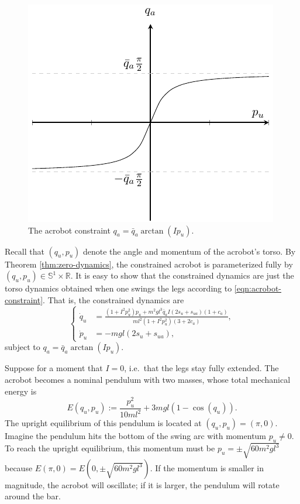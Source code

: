 \documentclass[journal,twoside,web]{ieeecolor}
\newcommand*{\R}{\mathbb{R}}
\newcommand*{\Sone}{\mathbb{S}^1}
\newcommand*{\SxR}{\Sone \times \R}
\begin{document}
\begin{figure}
    \centering
    \includegraphics[width=0.7\linewidth]{qa_arctan.pdf}
    \caption{The acrobot constraint \(q_a = \bar{q}_a \arctan(I p_u)\).}
    \label{fig:qa-arctan}
\end{figure}

Recall that \((q_u, p_u)\) denote the angle and momentum of the acrobot's torso.
By Theorem \ref{thm:zero-dynamics}, the constrained acrobot is parameterized
fully by \((q_u,p_u) \in \SxR\).
It is easy to show that the constrained dynamics are just the torso dynamics
obtained when one swings the legs according to \eqref{eqn:acrobot-constraint}.
That is, the constrained dynamics are
\begin{equation}\label{eqn:acrobot-constrained-dynamics}
    \begin{cases}
    \dot{q}_u &= \frac{(1+I^2 p_u^2)p_u + m^2gl^3\bar{q}_a I(2s_u + s_{ua})(1+c_a) }
            {ml^2(1+I^2 p_u^2)(3+2c_a)}
    ,    \\
    \dot{p}_u &= - m g l (2s_u + s_{ua})
    ,
    \end{cases}
\end{equation}
subject to \(q_a = \bar{q}_a \arctan(I p_u)\).

Suppose for a moment that \(I = 0\), i.e.~that the legs stay fully extended.
The acrobot becomes a nominal pendulum with two masses, whose total mechanical
energy is
\begin{equation}\label{eqn:acrobot-energy}
    E(q_u,p_u) := \frac{p_u^2}{10ml^2} + 3mgl(1 - \cos(q_u))
    .
\end{equation}
The upright equilibrium of this pendulum is located at \((q_u,p_u) = (\pi,0)\).
Imagine the pendulum hits the bottom of the swing arc with momentum 
\(p_u \neq 0\). 
To reach the upright equilibrium, this momentum must be
\(p_u = \pm\sqrt{60m^2gl^3}\) because \(E(\pi,0) = E(0,\pm\sqrt{60m^2gl^3})\).
If the momentum is smaller in magnitude, the acrobot will oscillate; 
if it is larger, the pendulum will rotate around the bar.
\end{document}
